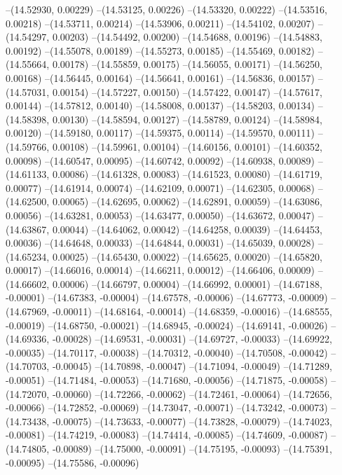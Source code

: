 --(14.52930, 0.00229)
--(14.53125, 0.00226)
--(14.53320, 0.00222)
--(14.53516, 0.00218)
--(14.53711, 0.00214)
--(14.53906, 0.00211)
--(14.54102, 0.00207)
--(14.54297, 0.00203)
--(14.54492, 0.00200)
--(14.54688, 0.00196)
--(14.54883, 0.00192)
--(14.55078, 0.00189)
--(14.55273, 0.00185)
--(14.55469, 0.00182)
--(14.55664, 0.00178)
--(14.55859, 0.00175)
--(14.56055, 0.00171)
--(14.56250, 0.00168)
--(14.56445, 0.00164)
--(14.56641, 0.00161)
--(14.56836, 0.00157)
--(14.57031, 0.00154)
--(14.57227, 0.00150)
--(14.57422, 0.00147)
--(14.57617, 0.00144)
--(14.57812, 0.00140)
--(14.58008, 0.00137)
--(14.58203, 0.00134)
--(14.58398, 0.00130)
--(14.58594, 0.00127)
--(14.58789, 0.00124)
--(14.58984, 0.00120)
--(14.59180, 0.00117)
--(14.59375, 0.00114)
--(14.59570, 0.00111)
--(14.59766, 0.00108)
--(14.59961, 0.00104)
--(14.60156, 0.00101)
--(14.60352, 0.00098)
--(14.60547, 0.00095)
--(14.60742, 0.00092)
--(14.60938, 0.00089)
--(14.61133, 0.00086)
--(14.61328, 0.00083)
--(14.61523, 0.00080)
--(14.61719, 0.00077)
--(14.61914, 0.00074)
--(14.62109, 0.00071)
--(14.62305, 0.00068)
--(14.62500, 0.00065)
--(14.62695, 0.00062)
--(14.62891, 0.00059)
--(14.63086, 0.00056)
--(14.63281, 0.00053)
--(14.63477, 0.00050)
--(14.63672, 0.00047)
--(14.63867, 0.00044)
--(14.64062, 0.00042)
--(14.64258, 0.00039)
--(14.64453, 0.00036)
--(14.64648, 0.00033)
--(14.64844, 0.00031)
--(14.65039, 0.00028)
--(14.65234, 0.00025)
--(14.65430, 0.00022)
--(14.65625, 0.00020)
--(14.65820, 0.00017)
--(14.66016, 0.00014)
--(14.66211, 0.00012)
--(14.66406, 0.00009)
--(14.66602, 0.00006)
--(14.66797, 0.00004)
--(14.66992, 0.00001)
--(14.67188, -0.00001)
--(14.67383, -0.00004)
--(14.67578, -0.00006)
--(14.67773, -0.00009)
--(14.67969, -0.00011)
--(14.68164, -0.00014)
--(14.68359, -0.00016)
--(14.68555, -0.00019)
--(14.68750, -0.00021)
--(14.68945, -0.00024)
--(14.69141, -0.00026)
--(14.69336, -0.00028)
--(14.69531, -0.00031)
--(14.69727, -0.00033)
--(14.69922, -0.00035)
--(14.70117, -0.00038)
--(14.70312, -0.00040)
--(14.70508, -0.00042)
--(14.70703, -0.00045)
--(14.70898, -0.00047)
--(14.71094, -0.00049)
--(14.71289, -0.00051)
--(14.71484, -0.00053)
--(14.71680, -0.00056)
--(14.71875, -0.00058)
--(14.72070, -0.00060)
--(14.72266, -0.00062)
--(14.72461, -0.00064)
--(14.72656, -0.00066)
--(14.72852, -0.00069)
--(14.73047, -0.00071)
--(14.73242, -0.00073)
--(14.73438, -0.00075)
--(14.73633, -0.00077)
--(14.73828, -0.00079)
--(14.74023, -0.00081)
--(14.74219, -0.00083)
--(14.74414, -0.00085)
--(14.74609, -0.00087)
--(14.74805, -0.00089)
--(14.75000, -0.00091)
--(14.75195, -0.00093)
--(14.75391, -0.00095)
--(14.75586, -0.00096)
